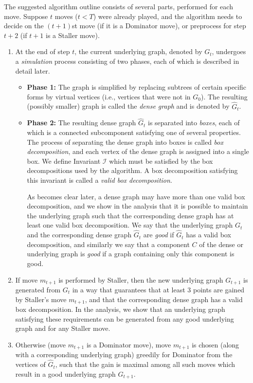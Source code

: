 \documentclass[11pt]{article}
\def\dnsitem{\vspace{-7pt}\item}
\def\dnssubitem{\vspace{-5pt}\item}
\theoremstyle{definition}
\def\invboxes{\mathcal{I}}
\begin{document}
The suggested algorithm outline consists of several parts, performed for each move.
Suppose $t$ moves ($t < T$) were already played, and the algorithm needs to decide on the $(t+1)$st move (if it is a Dominator move), or preprocess for step $t+2$ (if $t+1$ is a Staller move).
\begin{enumerate}
	\dnsitem At the end of step $t$, the current underlying graph, denoted by $G_t$, undergoes a \emph{simulation} process consisting of two phases, each of which is described in detail later.
	\begin{itemize}
		\dnsitem {\bf Phase 1:}
		The graph is simplified by replacing subtrees of certain specific forms by virtual vertices (i.e., vertices that were not in $G_0$).
		The resulting (possibly smaller) graph is called the \emph{dense graph} and is denoted by $\hat{G}_t$.

		\dnssubitem {\bf Phase 2:}
		The resulting dense graph $\hat{G}_t$ is separated into \emph{boxes}, each of which is a connected subcomponent satisfying one of several properties.
		The process of separating the dense graph into boxes is called \emph{box decomposition}, and each vertex of the dense graph is assigned into a single box.
		We define Invariant $\invboxes$ which must be satisfied by the box decompositions used by the algorithm.
		A box decomposition satisfying this invariant is called a \emph{valid box decomposition}. 
		
		As becomes clear later, a dense graph may have more than one valid box decomposition, 
		and we show in the analysis that it is possible to maintain the underlying graph such that the corresponding dense graph has at least one valid box decomposition.
		We say that the underlying graph $G_t$ and the corresponding dense graph $\hat{G}_t$ are \emph{good} if $\hat{G}_t$ has a valid box decomposition, 
		and similarly we say that a component $C$ of the dense or underlying graph is \emph{good} if a graph containing only this component is good.
	\end{itemize}

	\dnsitem If move $m_{t+1}$ is performed by Staller, then the new underlying graph $G_{t+1}$ is generated from $G_t$ in a way that guarantees that at least $3$ points are gained 
	by Staller's move $m_{t+1}$, 
	and that the corresponding dense graph has a valid box decomposition.
	In the analysis, we show that an underlying graph satisfying these requirements can be generated from any good underlying graph and for any Staller move.

	\dnsitem 
	\label{alg_outline:choose_dom}
	Otherwise (move $m_{t+1}$ is a Dominator move),
	move $m_{t+1}$ is chosen (along with a corresponding underlying graph) greedily for Dominator from the vertices of $\hat{G}_t$,
	such that the gain is maximal among all such moves which result in a good underlying graph $G_{t+1}$.
	

\end{enumerate}
\end{document}
